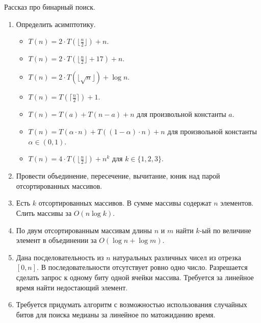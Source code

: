 \section{}

Рассказ про бинарный поиск.

\begin{enumerate}

  \item Определить асимптотику.
    \begin{itemize}
      \item $T(n) = 2 \cdot T(\lfloor \frac{n}{2} \rfloor) + n$.
      \item $T(n) = 2 \cdot T(\lfloor \frac{n}{2} \rfloor + 17) + n$.
      \item $T(n) = 2 \cdot T(\lfloor \sqrt{n} \rfloor) + \log n$.
      \item $T(n) = T(\lceil \frac{n}{2} \rceil) + 1$.
      \item $T(n) = T(a) + T(n - a) + n$ для произвольной константы $a$.
      \item $T(n) = T(\alpha \cdot n) + T((1 - \alpha) \cdot n) + n$ для произвольной
                константы $\alpha \in (0, 1)$.
      \item $T(n) = 4 \cdot T(\lfloor \frac{n}{2} \rfloor) + n^k$ для $k \in \{1, 2, 3\}$.
    \end{itemize}

  \item Провести объединение, пересечение, вычитание, юник над парой отсортированных
     массивов.

  \item Есть $k$ отсортированных массивов. В сумме массивы содержат $n$ элементов.
        Слить массивы за $O(n \log k)$.

  \item По двум отсортированным массивам длины $n$ и $m$ найти $k$-ый по величине
        элемент в объединении за $O(\log n + \log m)$.
  
  \item Дана посделовательность из $n$ натуральных различных чисел из отрезка $[0, n]$.
        В последовательности отсутствует ровно одно число. Разрешается сделать запрос 
        к одному биту одной ячейки массива. Требуется за линейное время найти
        недостающий элемент.

  \item Требуется придумать алгоритм с возможностью использования случайных битов для
        поиска медианы за линейное по матожиданию время. 


\end{enumerate}
